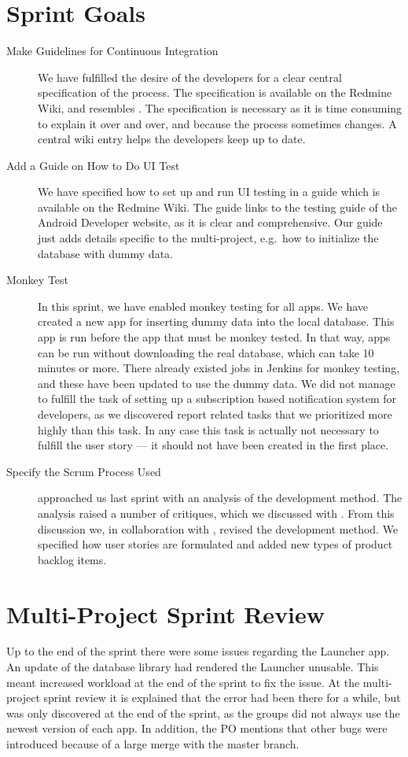 \section{Sprint Goals}\label{sec:s3_goals}
\begin{description}
  \item[Make Guidelines for Continuous Integration] We have fulfilled the desire of the developers for a clear central specification of the process. The specification is available on the Redmine Wiki, and resembles . The specification is necessary as it is time consuming to explain it over and over, and because the process sometimes changes. A central wiki entry helps the developers keep up to date.
  \item[Add a Guide on How to Do UI Test] We have specified how to set up and run UI testing in a guide which is available on the Redmine Wiki. The guide links to the testing guide \parencite{AndroidUnit} of the Android Developer website, as it is clear and comprehensive. Our guide just adds details specific to the multi-project, e.g.\ how to initialize the database with dummy data.
  \item[Monkey Test] In this sprint, we have enabled monkey testing for all apps. We have created a new app for inserting dummy data into the local database.  This app is run before the app that must be monkey tested. In that way, apps can be run without downloading the real database, which can take 10 minutes or more. There already existed jobs in Jenkins for monkey testing, and these have been updated to use the dummy data. We did not manage to fulfill the task of setting up a subscription based notification system for developers, as we discovered report related tasks that we prioritized more highly than this task. In any case this task is actually not necessary to fulfill the user story --- it should not have been created in the first place.
  \item[Specify the Scrum Process Used]  approached us last sprint with an analysis of the development method. The analysis raised a number of critiques, which we discussed with . From this discussion we, in collaboration with , revised the development method. We specified how user stories are formulated and added new types of product backlog items.
\end{description}

\section{Multi-Project Sprint Review}\label{sec:s3_multiprj_review}
Up to the end of the sprint there were some issues regarding the Launcher app. An update of the database library had rendered the Launcher unusable. This meant increased workload at the end of the sprint to fix the issue. At the multi-project sprint review it is explained that the error had been there for a while, but was only discovered at the end of the sprint, as the \gui groups did not always use the newest version of each app. In addition, the \db PO mentions that other bugs were introduced because of a large merge with the master branch.

